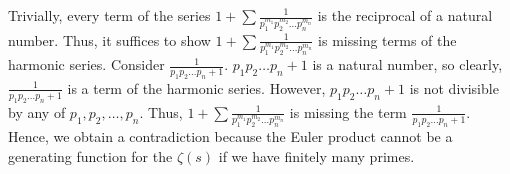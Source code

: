 \documentclass[10pt]{article}
\begin{document}
\begin{enumerate}
    Trivially, every term of the series $\displaystyle 1+\sum\frac{1}{p_1^{m_1}p_2^{m_2}\ldots p_n^{m_n}}$ is the reciprocal of a natural number.
    Thus, it suffices to show $\displaystyle1+\sum\frac{1}{p_1^{m_1}p_2^{m_2}\ldots p_n^{m_n}}$ is missing terms of the harmonic series.
    Consider $\frac{1}{p_1p_2\ldots p_n+1}$. $p_1p_2\ldots p_n+1$ is a natural number, so clearly, $\frac{1}{p_1p_2\ldots p_n+1}$ is a term of the harmonic series.
    However, $p_1p_2\ldots p_n+1$ is not divisible by any of $p_1,p_2,\ldots,p_n$.  
    Thus, $\displaystyle 1+\sum\frac{1}{p_1^{m_1}p_2^{m_2}\ldots p_n^{m_n}}$ is missing the term $\frac{1}{p_1p_2\ldots p_n+1}$.
    Hence, we obtain a contradiction because the Euler product cannot be a generating function for the $\zeta(s)$ if we have finitely many primes. 
\end{enumerate}
\end{document}
